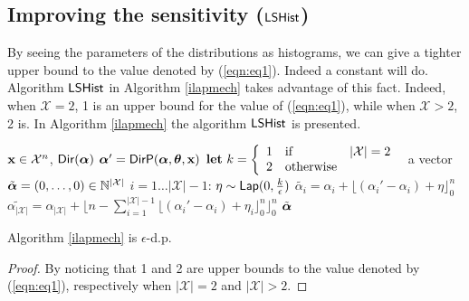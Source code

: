 \documentclass{article}
\begin{document}
\subsection{Improving the sensitivity ($\ilapmech$)}
\label{sec_ell1_hist}
By seeing the parameters of the distributions as histograms, we can give a tighter upper bound to the value denoted by (\ref{eqn:eq1}).
Indeed a constant will do. Algorithm $\ilapmech$ in Algorithm \ref{ilapmech} takes advantage of this fact. 
Indeed, when $\mathcal{X}=2$, 1 is an upper bound for the value of (\ref{eqn:eq1}), while when $\mathcal{X}>2$, 2 is.
In Algorithm \ref{ilapmech} the algorithm $\ilapmech$ is presented.
\begin{algorithm}
  \caption{$\ilapmech$}
  \label{ilapmech}
  \begin{algorithmic}
  \INPUT $\textbf{x}\in\mathcal{X}^n$, $\mathsf{Dir}(\boldsymbol{\alpha})$
  \STATE {} $\boldsymbol{\alpha}' = \mathsf{DirP}(\boldsymbol{\alpha},\boldsymbol{\theta},\textbf{x})$
  \STATE \quad ${\bf let}\ k=\left \{
        \begin{array}{lll}          
          1&\text{if}& |\mathcal{X}|=2\\
          2&\text{otherwise}
        \end{array}
      \right .\ $
  \STATE {} a vector $\tilde{\boldsymbol{\alpha}} = (0, \dots, 0 )\in \mathbb{N}^{|\mathcal{X}|}$ 
  \STATE {} $i = 1 \dots |\mathcal{X}|-1$:
  \STATE \quad {} $\eta \sim \mathsf{Lap}(0, \frac{k}{\epsilon})$
  \STATE \quad \quad  $\tilde{\alpha_i}=\alpha_i + \lfloor{(\alpha_i' - \alpha_i) + \eta}\rfloor^n_0$ 
  \STATE \quad $\tilde{\alpha_{|\mathcal{X}|}} = \alpha_{|\mathcal{X}|} + \lfloor n - \sum_{i = 1}^{|\mathcal{X}|-1}\lfloor{(\alpha_i' - \alpha_i) + \eta_i}\rfloor^n_0 \rfloor^n_0$
   $\tilde{\boldsymbol{\alpha}}$
  \end{algorithmic}
\end{algorithm}
\begin{lem}
  Algorithm \ref{ilapmech} is $\epsilon$-d.p.
  \begin{proof} By noticing that 1 and 2 are upper bounds to the value denoted by (\ref{eqn:eq1}), respectively when $|\mathcal{X}|=2$ and $|\mathcal{X}|>2$.
  \end{proof}
\end{lem}
\end{document}
